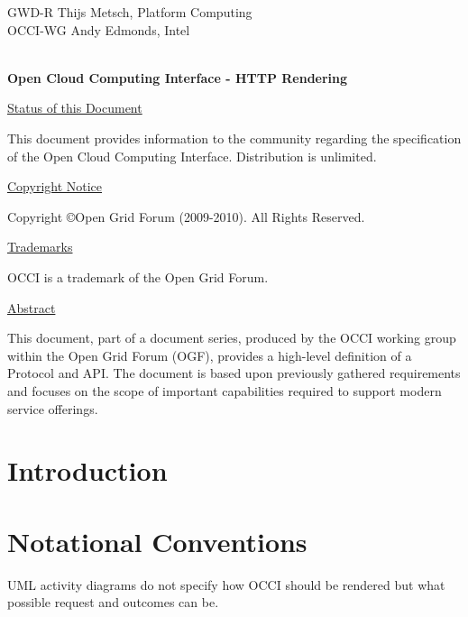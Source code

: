 \documentclass[10pt,a4paper]{article}
\begin{document}
\thispagestyle{empty}

GWD-R \hfill Thijs Metsch, Platform Computing\\
OCCI-WG \hfill Andy Edmonds, Intel\\
\\

\vspace*{0.5in}

\begin{Large}
\textbf{Open Cloud Computing Interface - HTTP Rendering}
\end{Large}

\vspace*{0.5in}

\underline{Status of this Document}

This document provides information to the community regarding the
specification of the Open Cloud Computing Interface. Distribution is
unlimited.

\underline{Copyright Notice}

Copyright \copyright Open Grid Forum (2009-2010). All Rights Reserved.

\underline{Trademarks}

OCCI is a trademark of the Open Grid Forum.

\underline{Abstract}

This document, part of a document series, produced by the OCCI working
group within the Open Grid Forum (OGF), provides a high-level
definition of a Protocol and API. The document is based upon
previously gathered requirements and focuses on the scope of important
capabilities required to support modern service offerings.

\newpage
\tableofcontents
\newpage

\section{Introduction}


\section{Notational Conventions}


UML activity diagrams do not specify how OCCI should be rendered but
what possible request and outcomes can be.
\end{document}
